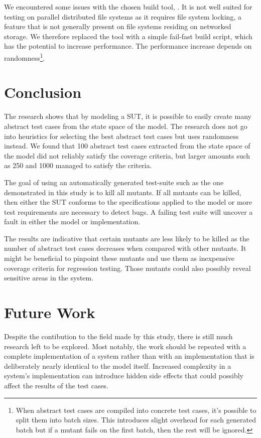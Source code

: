 \documentclass{article}
\begin{document}
		We encountered some issues with the chosen build tool, \citeauthor{sbt}. It is not well suited for testing on parallel distributed file systems as it requires file system locking, a feature that is not generally present on file systems residing on networked storage. We therefore replaced the tool with a simple fail-fast build script, which has the potential to increase performance. The performance increase depends on randomness\footnote{When abstract test cases are compiled into concrete test cases, it's possible to split them into batch sizes. This introduces slight overhead for each generated batch but if a mutant fails on the first batch, then the rest will be ignored.}.


	\section{Conclusion}
		The research shows that by modeling a SUT, it is possible to easily create many abstract test cases from the state space of the model. The research does not go into heuristics for selecting the best abstract test cases but uses randomness instead. We found that 100 abstract test cases extracted from the state space of the model did not reliably satisfy the coverage criteria, but larger amounts such as 250 and 1000 managed to satisfy the criteria.

		The goal of using an automatically generated test-suite such as the one demonstrated in this study is to kill all mutants. If all mutants can be killed, then either the SUT conforms to the specifications applied to the model or more test requirements are necessary to detect bugs. A failing test suite will uncover a fault in either the model or implementation.

		The results are indicative that certain mutants are less likely to be killed as the number of abstract test cases decreases when compared with other mutants. It might be beneficial to pinpoint these mutants and use them as inexpensive coverage criteria for regression testing. Those mutants could also possibly reveal sensitive areas in the system.

	\section{Future Work}
		Despite the contibution to the field made by this study, there is still much research left to be explored. Most notably, the work should be repeated with a complete implementation of a system rather than with an implementation that is deliberately nearly identical to the model itself. Increased complexity in a system's implementation can introduce hidden side effects that could possibly affect the results of the test cases.
\end{document}

